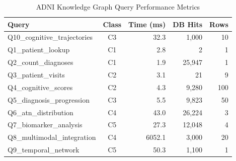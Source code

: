 
\begin{table}[htbp]
\centering
\caption{ADNI Knowledge Graph Query Performance Metrics}
\label{tab:performance_metrics}
\begin{tabular}{|l|c|r|r|r|}
\hline
\textbf{Query} & \textbf{Class} & \textbf{Time (ms)} & \textbf{DB Hits} & \textbf{Rows} \\
\hline
Q10\_cognitive\_trajectories & C3 & 32.3 & 1,000 & 10 \\
Q1\_patient\_lookup & C1 & 2.8 & 2 & 1 \\
Q2\_count\_diagnoses & C1 & 1.9 & 25,947 & 1 \\
Q3\_patient\_visits & C2 & 3.1 & 21 & 9 \\
Q4\_cognitive\_scores & C2 & 4.3 & 9,280 & 100 \\
Q5\_diagnosis\_progression & C3 & 5.5 & 9,823 & 50 \\
Q6\_atn\_distribution & C4 & 43.0 & 26,224 & 3 \\
Q7\_biomarker\_analysis & C5 & 27.3 & 12,048 & 4 \\
Q8\_multimodal\_integration & C4 & 6052.1 & 3,000 & 20 \\
Q9\_temporal\_network & C5 & 50.3 & 1,100 & 1 \\
\hline
\end{tabular}
\end{table}
